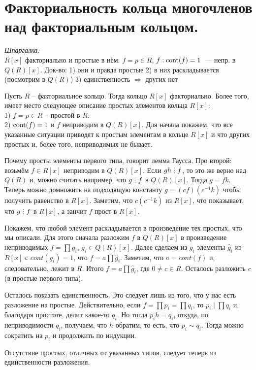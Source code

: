 \section{
 Факториальность кольца многочленов над факториальным кольцом.
}

{\it Шпаргалка:}\\
$R[x]$ факториально и простые в нём: $f = p \in R$, $f: \operatorname{cont}(f) = 1$~--- непр. в $Q(R)[x]$. Док-во: 1) они и правда простые 2) в них раскладывается (посмотрим в $Q(R)$) 3) единственность $\Rightarrow$ других нет

\thrm Пусть $R$ -- факториальное кольцо. Тогда кольцо $R[x]$ факториально. Более того, имеет место следующее описание простых элементов кольца $R[x]$:\\
1) $f=p \in R$ -- простой в $R$.\\
2) $\operatorname{cont}(f)=1$ и $f$ неприводим в $Q(R)[x]$.
\proof 
Для начала покажем, что все указанные ситуации приводят к простым элементам в кольце $R[x]$ и что других простых и, более того, неприводимых не бывает.

 Почему просты элементы первого типа, говорит лемма Гаусса. Про второй: возьмём $f \in R[x]$ неприводим в $Q(R)[x]$. Если $gh\di f$, то это же верно над $Q(R)$ и, можно считать например, что $g\di f$ в $Q(R)[x]$. Тогда $g= fk$. Теперь можно домножить на подходящую константу $g= (cf) (c^{-1}k)$ чтобы получить равенство в $R[x]$. Заметим, что $c(c^{-1}k)$ из $R[x]$, что показывает, что $g \di f$ в $R[x]$, а занчит $f$ прост в $R[x]$.

Покажем, что любой элемент раскладывается в произведение тех простых, что мы описали. Для этого сначала разложим $f$ в $Q(R)[x]$ в произведение неприводимых $f=\prod g_i$, $g_i \in Q(R)[x]$. Далее сделаем из $g_i$ элементы $\hat{g}_i$ из $R[x]$ с $cont(g_i)=1$, что $f=a\prod \hat{g}_i$. Заметим, что $a=cont(f)$ и, следовательно, лежит в $R$. Итого $f=a\prod \hat{g}_i$, где $ 0 \neq c \in R$. Осталось разложить $c$ (в простые первого типа).

Осталось показать единственность. Это следует лишь из того, что у нас есть разложение на простые. Действительно, если $f=\prod p_i=\prod q_i$, то $p_i \mid \prod q_i$ и, благодаря простоте, делит какое-то $q_i$. Но тогда $p_ih=q_i$, откуда, по неприводимости $q_i$, получаем, что $h$ обратим, то есть, что $p_i \sim q_i$. Тогда можно сократить на $p_i$ и продолжить по индукции. 

Отсутствие простых, отличных от указанных типов, следует теперь из единственности разложения.
\endproof
\ethrm
